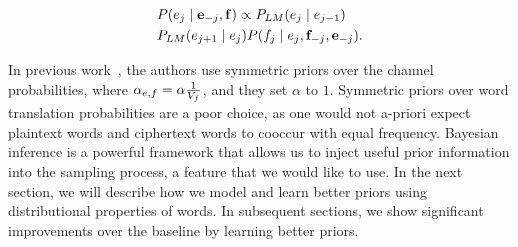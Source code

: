
\begin{align} \label{prob_sampling_plaintext}
&P( e_j \mid \mathbf{e}_{-j}, \mathbf{f} ) \propto  P_{LM}(e_j \mid e_{j-1})  \\
&           P_{LM}(e_{j+1} \mid e_{j})   P(f_j \mid e_j,\mathbf{f}_{-j}, \mathbf{e}_{-j}).
\end{align}

\iffalse
%
\[
\label{p_sample}
P_{sample}(e_{1}e_{2}) =  P(e_{1}e_{2}) \prod_{i=1}^{2}P_{CRP}(f_{i}|e_{i})
\]
%
In the above equation, the translation probability $P_{CRP}(f_{i}|e_{i})$ is modeled by the Chinese Restaurant Process(CRP) as defined in Equation \ref{p_channel}.
\[
\label{p_channel}
P_{CRP}(f_{i}|e_{i}) = \frac{\alpha P_0(f_{i}|e_{i})+count(f_{i},e_{i})}{\alpha+count(e_{i})}
\]
%
where $P_{0}$ is a base distribution, also known as a prior, and $\alpha$ is a parameter that controls how much we trust the base distribution. $count(f_{i},e_{i})$ and $count(e_{i})$ record the number of times $f_{i},e_{i}$ and $e_{i}$ appear in previously generated samples respectively. The base distribution is given independently, and in all the previous work, it is set to uniform.
\fi

\iffalse
At the end of sampling, we compute $P(\cipher \mid \plain)$ from ciphertext and its plaintext samples using maximum likelihood estimation:

\[
\label{mlh_estimation}
P(\cipher \mid \plain) =  \frac{\#(\cipher,\plain)}{\#(\plain)}.
\]
\fi

In previous work~\cite{Dou:2012,dou-knight:2013:EMNLP}, the authors use symmetric priors over the channel probabilities, where $\alpha_{e,f} = \alpha \frac{1}{V_{f}}$, and they set $\alpha$ to $1$. Symmetric priors over word translation probabilities are a poor choice, as one would not a-priori expect plaintext words and ciphertext words to cooccur with equal frequency. Bayesian inference is a powerful framework that allows us to inject useful prior information into the sampling process, a feature that we would like to use. In the next section, we will describe how we model and learn better priors using distributional properties of words. In subsequent sections, we show significant improvements over the baseline by learning better priors.


